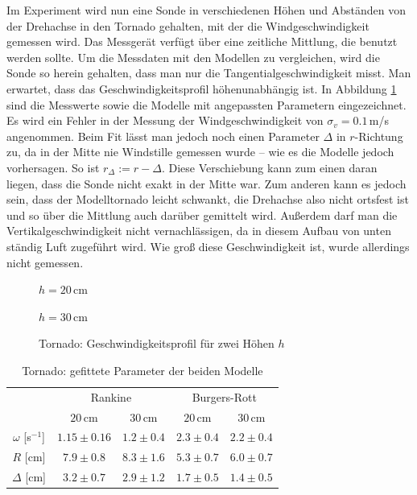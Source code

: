 \documentclass[12pt,a4paper,headinclude,bibtotoc]{scrartcl}
\begin{document}
Im Experiment wird nun eine Sonde in verschiedenen Höhen und Abständen von der Drehachse in den Tornado gehalten, mit der die Windgeschwindigkeit gemessen wird.
Das Messgerät verfügt über eine zeitliche Mittlung, die benutzt werden sollte.
Um die Messdaten mit den Modellen zu vergleichen, wird die Sonde so herein gehalten, dass man nur die Tangentialgeschwindigkeit misst.
Man erwartet, dass das Geschwindigkeitsprofil höhenunabhängig ist.
In Abbildung \ref{fig:tornado} sind die Messwerte sowie die Modelle mit angepassten Parametern eingezeichnet.
Es wird ein Fehler in der Messung der Windgeschwindigkeit von $\sigma_v = 0.1\,$m/s angenommen.
Beim Fit lässt man jedoch noch einen Parameter $\Delta$ in $r$-Richtung zu, da in der Mitte nie Windstille gemessen wurde -- wie es die Modelle jedoch vorhersagen.
So ist $r_\Delta:=r-\Delta$.
Diese Verschiebung kann zum einen daran liegen, dass die Sonde nicht exakt in der Mitte war.
Zum anderen kann es jedoch sein, dass der Modelltornado leicht schwankt, die Drehachse also nicht ortsfest ist und so über die Mittlung auch darüber gemittelt wird.
Außerdem darf man die Vertikalgeschwindigkeit nicht vernachlässigen, da in diesem Aufbau von unten ständig Luft zugeführt wird.
Wie groß diese Geschwindigkeit ist, wurde allerdings nicht gemessen.
 \begin{figure}[!htb]
	\begin{minipage}{0.5\textwidth}	
		\resizebox{\textwidth}{!}{   		
   		}
   		\caption*{\footnotesize{$h=20\,$cm}}
   \end{minipage}   
   \begin{minipage}{0.5\textwidth}   		
		\resizebox{\textwidth}{!}{   		
   		}
   		\caption*{\footnotesize{$h=30\,$cm}}
   \end{minipage}
   \caption{Tornado: Geschwindigkeitsprofil für zwei Höhen $h$}
   \label{fig:tornado}
 \end{figure}
 
\begin{table}[!htb]
 	\centering
 	\begin{tabular}{|c||c|c||c|c|}
 	\hline
 	& \multicolumn{2}{c||}{Rankine} & \multicolumn{2}{c|}{Burgers-Rott}\\
 	& $20\,$cm & $30\,$cm & $20\,$cm & $30\,$cm\\
 	\hline
 	$\omega$ [s$^{-1}$]& $1.15 \pm 0.16$ & $1.2 \pm 0.4$ & $2.3 \pm 0.4$ & $2.2 \pm 0.4$ \\
 	$R$ [cm]               & $7.9 \pm 0.8$ & $8.3 \pm 1.6$ & $5.3 \pm 0.7$ & $6.0 \pm 0.7 $ \\
 	$\Delta$ [cm]         & $3.2 \pm 0.7$ & $2.9 \pm 1.2$ & $1.7  \pm 0.5$ & $ 1.4 \pm 0.5$ \\
 	\hline
 	\end{tabular}
 	\caption{Tornado: gefittete Parameter der beiden Modelle}
 	\label{tab:tornado}
 \end{table} 
 
\end{document}
